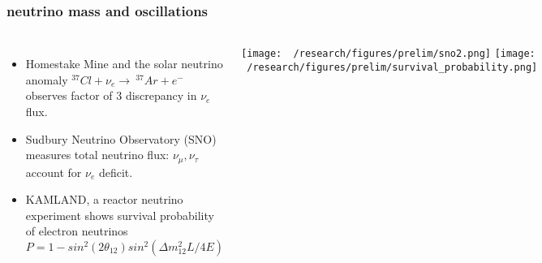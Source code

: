 \documentclass{beamer}
\begin{document}
	\begin{frame}
		\frametitle{neutrino mass and oscillations}
		\begin{columns}[c] %
			
			\begin{itemize}
				\setlength\itemsep{2em}
				\item Homestake Mine and the solar neutrino anomaly $^{37}Cl+\nu_e \rightarrow \ ^{37}Ar + e^-$ observes factor of 3 discrepancy in $\nu_e$ flux.
				\item Sudbury Neutrino Observatory (SNO) measures total neutrino flux: $\nu_{\mu}, \nu_{\tau}$ account for $\nu_e$ deficit.
				\item KAMLAND, a reactor neutrino experiment shows survival probability of electron neutrinos {\tiny$P = 1 - sin^2 (2\theta_{12})sin^2(\Delta m^2_{12} L \slash 4E)$}
				
			\end{itemize}
			
			
			\texttt{[image: ~/research/figures/prelim/sno2.png]}
			\texttt{[image: ~/research/figures/prelim/survival\_probability.png]}
			
		\end{columns}
	\end{frame}
	
\end{document}
